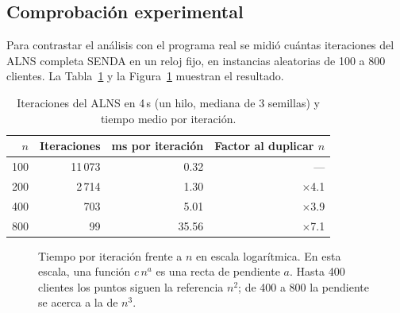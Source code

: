 \documentclass[11pt,a4paper]{article}
\begin{document}
\subsection{Comprobación experimental}

Para contrastar el análisis con el programa real se midió cuántas iteraciones del ALNS completa
SENDA en un reloj fijo, en instancias aleatorias de 100 a 800 clientes. La Tabla~\ref{tab:medicion}
y la Figura~\ref{fig:complejidad} muestran el resultado.

\begin{table}[H]
\centering
\caption{Iteraciones del ALNS en 4\,s (un hilo, mediana de 3 semillas) y tiempo medio por iteración.}
\label{tab:medicion}
\small
\begin{tabular}{@{}rrrr@{}}
\toprule
$n$ & Iteraciones & ms por iteración & Factor al duplicar $n$ \\
\midrule
100 & 11\,073 & 0.32 & --- \\
200 & 2\,714 & 1.30 & $\times$4.1 \\
400 & 703 & 5.01 & $\times$3.9 \\
800 & 99 & 35.56 & $\times$7.1 \\
\bottomrule
\end{tabular}
\end{table}

\begin{figure}[H]
\centering
{}
\caption{Tiempo por iteración frente a $n$ en escala logarítmica. En esta escala, una función
$c\,n^a$ es una recta de pendiente $a$. Hasta 400 clientes los puntos siguen la referencia $n^2$;
de 400 a 800 la pendiente se acerca a la de $n^3$.}
\label{fig:complejidad}
\end{figure}
\end{document}
